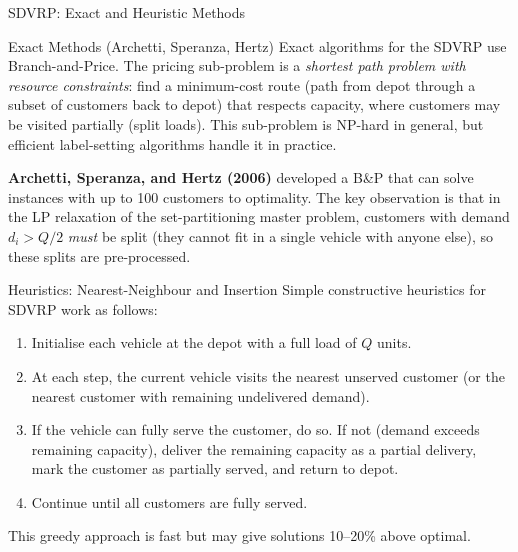 \documentclass[aspectratio=169,10pt]{beamer}
\begin{document}
\begin{frame}[allowframebreaks]{SDVRP: Exact and Heuristic Methods}

\begin{block}{Exact Methods (Archetti, Speranza, Hertz)}
  Exact algorithms for the SDVRP use Branch-and-Price.  The pricing
  sub-problem is a \emph{shortest path problem with resource constraints}:
  find a minimum-cost route (path from depot through a subset of customers
  back to depot) that respects capacity, where customers may be visited
  partially (split loads).  This sub-problem is NP-hard in general, but
  efficient label-setting algorithms handle it in practice.

  \medskip
  \textbf{Archetti, Speranza, and Hertz (2006)} developed a B\&P that can
  solve instances with up to 100 customers to optimality.  The key
  observation is that in the LP relaxation of the set-partitioning master
  problem, customers with demand $d_i > Q/2$ \emph{must} be split (they
  cannot fit in a single vehicle with anyone else), so these splits are
  pre-processed.
\end{block}

\begin{block}{Heuristics: Nearest-Neighbour and Insertion}
  Simple constructive heuristics for SDVRP work as follows:
  \begin{enumerate}
    \item Initialise each vehicle at the depot with a full load of $Q$ units.
    \item At each step, the current vehicle visits the nearest unserved
          customer (or the nearest customer with remaining undelivered demand).
    \item If the vehicle can fully serve the customer, do so.  If not (demand
          exceeds remaining capacity), deliver the remaining capacity as a
          partial delivery, mark the customer as partially served, and return
          to depot.
    \item Continue until all customers are fully served.
  \end{enumerate}
  This greedy approach is fast but may give solutions 10--20\% above optimal.
\end{block}

\framebreak


\end{frame}
\end{document}

